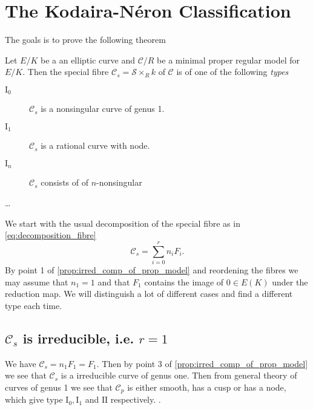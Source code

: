 \section{The Kodaira-Néron Classification} \label{sec:the_kodaira-néron_classification}

The goals is to prove the following theorem
\begin{theorem}
	Let $E / K$ be a an elliptic curve and $\mathcal{C}  / R$ be a minimal proper regular model for $E / K$.
	Then the special fibre $\mathcal{C} _s = \mathcal{S}  \times_R k$ of $\mathcal{C} $ is of one of the following \emph{types}
	\begin{description}
		\item[$\text{I}_0$] $\mathcal{C} _s$ is a nonsingular curve of genus 1. 
		\item[$\text{I}_1$ ] $\mathcal{C} _s$ is a rational curve with node. 
		\item[$\text{I}_n$ ] $\mathcal{C} _s$ consists of of $n$-nonsingular 
		\item[\ldots]
	\end{description}
\end{theorem}

We start with the usual decomposition of the special fibre as in \eqref{eq:decomposition_fibre} \[
	\mathcal{C}_s = \sum_{i = 0}^{r} n_i F_i
.\]  
By point 1 of \cref{prop:irred_comp_of_prop_model} and reordening the fibres we may assume that $n_1 = 1$ and that $F_1$ contains the image of $0 \in E (K)$ under the reduction map. We will distinguish a lot of different cases and find a different type each time.  
\subsection{$\mathcal{C} _s$ is irreducible, i.e. $r = 1$} \label{sec:C_s_is_irreducible,_i.e._r_=_1}
We have $\mathcal{C} _s = n_1 F_1 = F_1$. Then by point 3 of \cref{prop:irred_comp_of_prop_model} we see that  $\mathcal{C} _s$ is a irreducible curve of genus one. 
Then from general theory of curves of genus 1 we see that $\mathcal{C} _p$ is either smooth, has a cusp or has a node, which give type $\text{I}_0, \text{I}_1$ and $\text{II}$ respectively. . 

